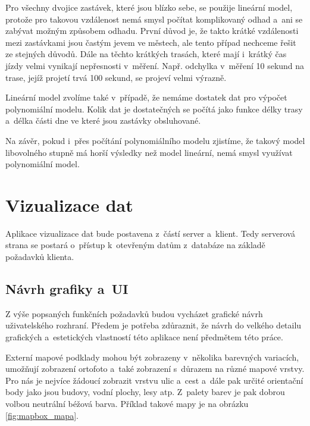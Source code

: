 \bigbreak


Pro všechny dvojice zastávek, které jsou blízko sebe, se použije lineární model, protože pro takovou vzdálenost nemá smysl počítat komplikovaný odhad a~ani se zabývat možným způsobem odhadu. První důvod je, že takto krátké vzdálenosti mezi zastávkami jsou častým jevem ve městech, ale tento případ nechceme řešit ze stejných důvodů. Dále na těchto krátkých trasách, které mají i~krátký čas jízdy velmi vynikají nepřesnosti v~měření. Např. odchylka v~měření 10 sekund na trase, jejíž projetí trvá 100 sekund, se projeví velmi výrazně.


\bigbreak


Lineární model zvolíme také v~případě, že nemáme dostatek dat pro výpočet polynomiální modelu. Kolik dat je dostatečných se počítá jako funkce délky trasy a~délka části dne ve které jsou zastávky obsluhované.


\bigbreak


Na závěr, pokud i~přes počítání polynomiálního modelu zjistíme, že takový model libovolného stupně má horší výsledky než model lineární, nemá smysl využívat polynomiální model.


\section{Vizualizace dat} \label{section:navrh_vizualizace}


 Aplikace vizualizace dat bude postavena z~částí server a~klient. Tedy serverová strana se postará o~přístup k~otevřeným datům z~databáze na základě požadavků klienta.


\subsection{Návrh grafiky a~UI}


Z výše popsaných funkčních požadavků budou vycházet grafické návrh uživatelského rozhraní. Předem je potřeba zdůraznit, že návrh do velkého detailu grafických a~estetických vlastností této aplikace není předmětem této práce.


\bigbreak


Externí mapové podklady mohou být zobrazeny v~několika barevných variacích, umožňují zobrazení ortofoto a~také zobrazení s~důrazem na různé mapové vrstvy. Pro nás je nejvíce žádoucí zobrazit vrstvu ulic a~cest a~dále pak určité orientační body jako jsou budovy, vodní plochy, lesy atp. Z~palety barev je pak dobrou volbou neutrální béžová barva. Příklad takové mapy je na obrázku \ref{fig:mapbox_mapa}.


